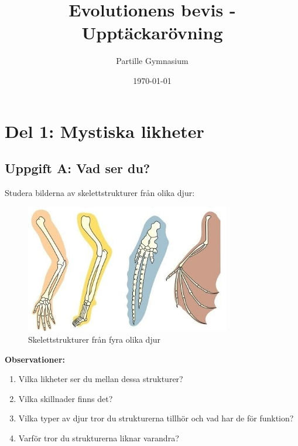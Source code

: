 \documentclass[a4paper,11pt]{article}
\title{Evolutionens bevis - Upptäckarövning}
\author{Partille Gymnasium}
\date{\today}
\begin{document}
\section{Del 1: Mystiska likheter}

\subsection{Uppgift A: Vad ser du?}

Studera bilderna av skelettstrukturer från olika djur:

\begin{figure}[H]
\centering
\includegraphics[width=0.8\textwidth]{homologous-organs.png}
\caption{Skelettstrukturer från fyra olika djur}
\end{figure}

\textbf{Observationer:}
\begin{enumerate}
    \item Vilka likheter ser du mellan dessa strukturer?
    
    \vspace{2.5cm}
    
    \item Vilka skillnader finns det?
    
    \vspace{2.5cm}
    
    \item Vilka typer av djur tror du strukturerna tillhör och vad har de för funktion?
    
    \vspace{2.5cm}
    \item Varför tror du strukturerna liknar varandra?
\end{enumerate}
\end{document}
